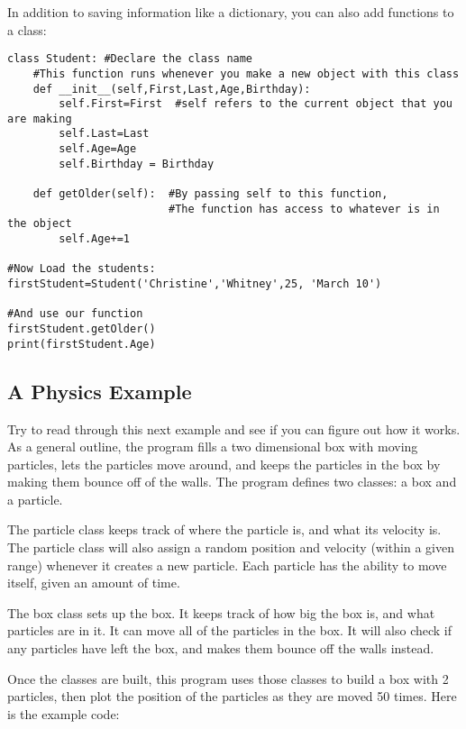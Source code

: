 In addition to saving information like a dictionary, you can also add functions to a class:

\begin{Verbatim}
class Student: #Declare the class name
    #This function runs whenever you make a new object with this class
    def __init__(self,First,Last,Age,Birthday):
        self.First=First  #self refers to the current object that you are making
        self.Last=Last
        self.Age=Age
        self.Birthday = Birthday

    def getOlder(self):  #By passing self to this function,
                         #The function has access to whatever is in the object
        self.Age+=1

#Now Load the students:
firstStudent=Student('Christine','Whitney',25, 'March 10')

#And use our function
firstStudent.getOlder()
print(firstStudent.Age)
\end{Verbatim}

\subsection*{A Physics Example}
Try to read through this next example and see if you can figure out how it works.  As a general outline, the program fills a two dimensional box with moving particles, lets the particles move around, and keeps the particles in the box by making them bounce off of the walls.  The program defines two classes: a box and a particle.

The particle class keeps track of where the particle is, and what its velocity is.  The particle class will also assign a random position and velocity (within a given range) whenever it creates a new particle.  Each particle has the ability to move itself, given an amount of time.

The box class sets up the box.  It keeps track of how big the box is, and what particles are in it.  It can move all of the particles in the box. It will also check if any particles have left the box, and makes them bounce off the walls instead.

Once the classes are built, this program uses those classes to build a box with 2 particles, then plot the position of the particles as they are moved 50 times. Here is the example code:

